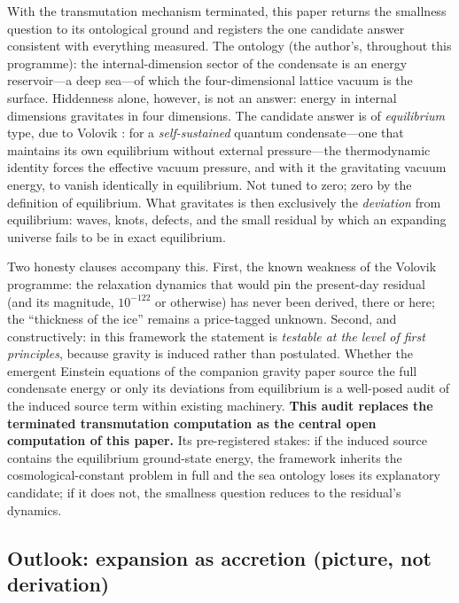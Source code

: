 \documentclass[11pt]{article}
\begin{document}
With the transmutation mechanism terminated, this paper returns the
smallness question to its ontological ground and registers the one
candidate answer consistent with everything measured.  The ontology
(the author's, throughout this programme): the internal-dimension
sector of the condensate is an energy reservoir---a deep sea---of
which the four-dimensional lattice vacuum is the surface.  Hiddenness
alone, however, is not an answer: energy in internal dimensions
gravitates in four dimensions.  The candidate answer is of
\emph{equilibrium} type, due to Volovik \cite{Volovik:2003fe}: for a
\emph{self-sustained} quantum condensate---one that maintains its own
equilibrium without external pressure---the thermodynamic identity
forces the effective vacuum pressure, and with it the gravitating
vacuum energy, to vanish identically in equilibrium.  Not tuned to
zero; zero by the definition of equilibrium.  What gravitates is then
exclusively the \emph{deviation} from equilibrium: waves, knots,
defects, and the small residual by which an expanding universe fails
to be in exact equilibrium.

Two honesty clauses accompany this.  First, the known weakness of the
Volovik programme: the relaxation dynamics that would pin the
present-day residual (and its magnitude, $10^{-122}$ or otherwise)
has never been derived, there or here; the ``thickness of the ice''
remains a price-tagged unknown.  Second, and constructively: in this
framework the statement is \emph{testable at the level of first
principles}, because gravity is induced rather than postulated.
Whether the emergent Einstein equations of the companion gravity
paper source the full condensate energy or only its deviations from
equilibrium is a well-posed audit of the induced source term within
existing machinery.  \textbf{This audit replaces the terminated
transmutation computation as the central open computation of this
paper.}  Its pre-registered stakes: if the induced source contains
the equilibrium ground-state energy, the framework inherits the
cosmological-constant problem in full and the sea ontology loses its
explanatory candidate; if it does not, the smallness question reduces
to the residual's dynamics.

\subsection*{Outlook: expansion as accretion (picture, not derivation)}
\end{document}

